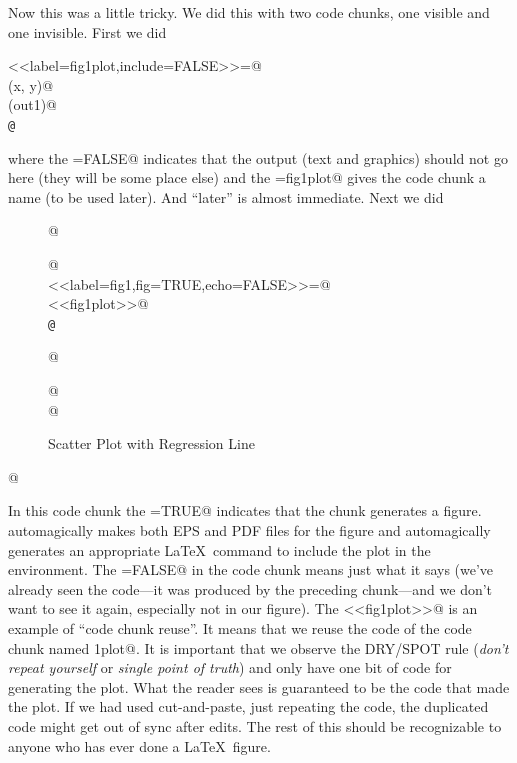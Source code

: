 \documentclass{article}
\begin{document}
Now this was a little tricky.  We did this with two code chunks,
one visible and one invisible.  First we did
\begin{tabbing}
\verb@<<label=fig1plot,include=FALSE>>=@ \\
\verb@plot(x, y)@ \\
\verb@abline(out1)@ \\
\verb+@+
\end{tabbing}
where the \verb@include=FALSE@ indicates that the output (text and graphics)
should not go here (they will be some place else) and the \verb@label=fig1plot@
gives the code chunk a name (to be used later).  And ``later'' is almost
immediate.  Next we did
\begin{tabbing}
\verb@\begin{figure}@ \\
\verb@\begin{center}@ \\
\verb@<<label=fig1,fig=TRUE,echo=FALSE>>=@ \\
\verb@<<fig1plot>>@ \\
\verb+@+ \\
\verb@\end{center}@ \\
\verb@\caption{Scatter Plot with Regression Line}@ \\
\verb@\label{fig:one}@ \\
\verb@\end{figure}@
\end{tabbing}
In this code chunk the \verb@fig=TRUE@ indicates that the chunk
generates a figure.  \verb@Sweave@ automagically makes both EPS and PDF
files for the figure and automagically generates an
appropriate \LaTeX\ \verb@{} command
to include the plot in the \verb@figure@ environment.
The \verb@echo=FALSE@ in the code chunk means just what it says
(we've already seen the code---it was produced by the preceding chunk---and
we don't want to see it again, especially not in our figure).
The \verb@<<fig1plot>>@ is an example of ``code chunk reuse''.
It means that we reuse the code of the code chunk named \verb@fig1plot@.
It is important that we observe the DRY/SPOT rule (\emph{don't repeat yourself}
or \emph{single point of truth}) and only have one bit of code for generating
the plot.  What the reader sees is guaranteed to be the code that made the
plot.  If we had used cut-and-paste, just repeating the code, the duplicated
code might get out of sync after edits.
The rest of this should be recognizable to anyone who has ever
done a \LaTeX\ figure.
\end{document}
